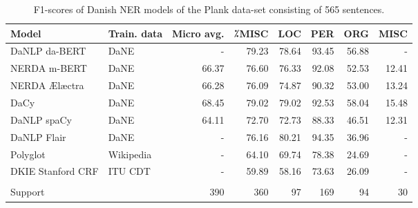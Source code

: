 \documentclass[main.tex]{subfiles}
\begin{document}
\begin{table}                                             
        \begin{center}                                    
                \begin{tabular}{l l r r r r r r}          
                        Model & Train. data & Micro avg. & ⁒MISC & LOC & PER & ORG & MISC \\                      
                        \hline                            
                        DaNLP da-BERT & DaNE & - & 79.23 & 78.64 & 93.45 & 56.88 & - \\                             
                        NERDA m-BERT & DaNE & 66.37 & 76.60 & 76.33 & 92.08 & 52.53 & 12.41 \\                      
                        NERDA Ælæctra & DaNE & 66.28 & 76.09 & 74.87 & 90.32 & 53.00 & 13.24 \\                     
                        DaCy & DaNE & 68.45 & 79.02 & 79.02 & 92.53 & 58.04 & 15.48 \\                              
                        DaNLP spaCy & DaNE & 64.11 & 72.70 & 72.73 & 88.33 & 46.51 & 12.31 \\                       
                        DaNLP Flair & DaNE & - & 76.16 & 80.21 & 94.35 & 36.96 & - \\                               
                        Polyglot & Wikipedia & - & 64.10 & 69.74 & 78.38 & 24.69 & - \\                             
                        DKIE Stanford CRF & ITU CDT & - & 59.89 & 58.16 & 73.63 & 26.09 & - \\                      
                         &  &  &  &  &  &  &  \\          
                        Support &  & 390 & 360 & 97 & 169 & 94 & 30 \\                                              
                \end{tabular}                             
        \end{center}                                      
        \caption{F1\pro-scores of Danish NER models of the Plank data-set consisting of 565 sentences.}             
        \label{tab:Plank}                                 
\end{table}                                               
\end{document}
